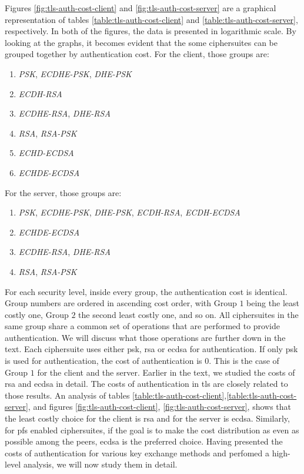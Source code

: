 Figures \ref{fig:tls-auth-cost-client} and \ref{fig:tls-auth-cost-server} are a graphical representation of tables \ref{table:tls-auth-cost-client} and \ref{table:tls-auth-cost-server},
respectively. In both of the figures, the data is presented in logarithmic scale. By looking at the graphs, it becomes evident that the some ciphersuites can be grouped together by authentication cost.
For the client, those groups are:

\begin{enumerate}
  \item \textit{PSK}, \textit{ECDHE-PSK}, \textit{DHE-PSK}
  \item \textit{ECDH-RSA}
  \item \textit{ECDHE-RSA}, \textit{DHE-RSA}
  \item \textit{RSA}, \textit{RSA-PSK}
  \item \textit{ECHD-ECDSA}
  \item \textit{ECHDE-ECDSA}
\end{enumerate}

For the server, those groups are:

\begin{enumerate}
  \item \textit{PSK}, \textit{ECDHE-PSK}, \textit{DHE-PSK}, \textit{ECDH-RSA}, \textit{ECDH-ECDSA}
  \item \textit{ECHDE-ECDSA}
  \item \textit{ECDHE-RSA}, \textit{DHE-RSA}
  \item \textit{RSA}, \textit{RSA-PSK}
\end{enumerate}

For each security level, inside every group, the authentication cost is identical. Group numbers are ordered in ascending cost order, with Group $1$
being the least costly one, Group $2$ the second least costly one, and so on. All ciphersuites in the same group share a common set of operations that
are performed to provide authentication. We will discuss what those operations are further down in the text. Each ciphersuite uses either \gls{psk},
\gls{rsa} or \gls{ecdsa} for authentication. If only \gls{psk} is used for authentication, the cost of authentication is $0$. This is the case of Group
$1$ for the client and the server. Earlier in the text, we studied the costs of \gls{rsa} and \gls{ecdsa} in detail.
The costs of authentication in \gls{tls} are closely related to those results. An analysis of tables 
\ref{table:tls-auth-cost-client},\ref{table:tls-auth-cost-server}, and figures \ref{fig:tls-auth-cost-client},
\ref{fig:tls-auth-cost-server}, shows that the least costly choice for the client is \gls{rsa} and for the
server is \gls{ecdsa}. Similarly, for \gls{pfs} enabled ciphersuites, if the goal is to make the cost distribution as even as possible among 
the peers, \gls{ecdsa} is the preferred choice. Having presented the costs of authentication for various key exchange methods 
and perfomed a high-level analysis, we will now study them in detail.

